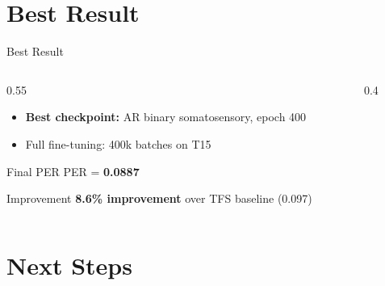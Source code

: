\documentclass[aspectratio=169]{beamer}
\begin{document}
\section{Best Result}

\begin{frame}{Best Result}
  \begin{columns}
    \begin{column}{0.55\textwidth}
      \begin{itemize}
        \item \textbf{Best checkpoint:} AR binary somatosensory, epoch 400
        \item Full fine-tuning: 400k batches on T15
      \end{itemize}
      \vspace{0.6em}
      \begin{block}{Final PER}
        \centering \Large PER = \textbf{0.0887}
      \end{block}
      \vspace{0.6em}
      \begin{exampleblock}{Improvement}
        \centering \textbf{8.6\% improvement} over TFS baseline (0.097)
      \end{exampleblock}
    \end{column}
    \begin{column}{0.4\textwidth}
      \begin{center}
      \end{center}
    \end{column}
  \end{columns}
\end{frame}

\section{Next Steps}
\end{document}
